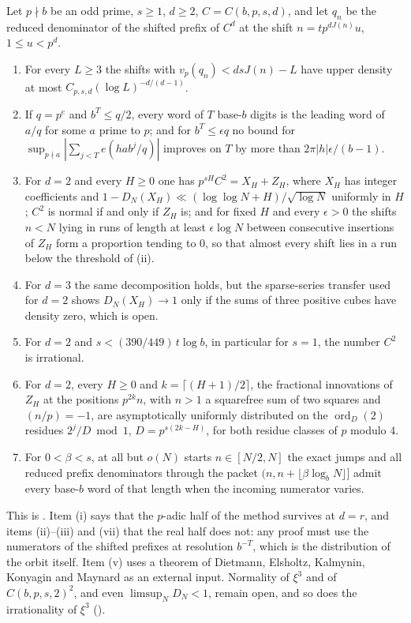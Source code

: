 \documentclass[11pt]{article}
\DeclareMathOperator{\ord}{ord}
\begin{document}
\begin{maintheorem}[The boundary $d=r$]\label{thm:boundary}
Let $p\nmid b$ be an odd prime, $s\ge1$, $d\ge2$, $C=C(b,p,s,d)$, and let $q_n$ be the reduced
denominator of the shifted prefix of $C^d$ at the shift $n=tp^{dJ(n)}u$, $1\le u<p^d$.
\begin{enumerate}[label=\textup{(\roman*)},nosep]
\item For every $L\ge3$ the shifts with $v_p(q_n)<dsJ(n)-L$ have upper density at most
$C_{p,s,d}(\log L)^{-d/(d-1)}$.
\item If $q=p^e$ and $b^T\le q/2$, every word of $T$ base-$b$ digits is the leading word of $a/q$ for
some $a$ prime to $p$; and for $b^T\le\epsilon q$ no bound for
$\sup_{p\nmid a}|\sum_{j<T}e(hab^j/q)|$ improves on $T$ by more than $2\pi|h|\epsilon/(b-1)$.
\item For $d=2$ and every $H\ge0$ one has $p^{sH}C^2=X_H+Z_H$, where $X_H$ has integer coefficients and
$1-D_N(X_H)\ll(\log\log N+H)/\sqrt{\log N}$ uniformly in $H$; $C^2$ is normal if and only if $Z_H$ is;
and for fixed $H$ and every $\epsilon>0$ the shifts $n<N$ lying in runs of length at least
$\epsilon\log N$ between consecutive insertions of $Z_H$ form a proportion tending to $0$, so that
almost every shift lies in a run below the threshold of \textup{(ii)}.
\item For $d=3$ the same decomposition holds, but the sparse-series transfer used for $d=2$ shows
$D_N(X_H)\to1$ only if the sums of three positive cubes have density zero, which is open.
\item For $d=2$ and $s<(390/449)\,t\log b$, in particular for $s=1$, the number $C^2$ is irrational.
\item For $d=2$, every $H\ge0$ and $k=\lceil(H+1)/2\rceil$, the fractional innovations of $Z_H$ at the
positions $p^{2k}n$, with $n>1$ a squarefree sum of two squares and $(n/p)=-1$, are asymptotically
uniformly distributed on the $\ord_D(2)$ residues $2^j/D\bmod1$, $D=p^{s(2k-H)}$, for both residue classes
of $p$ modulo $4$.
\item For $0<\beta<s$, at all but $o(N)$ starts $n\in[N/2,N]$ the exact jumps and all reduced
prefix denominators through the packet $(n,n+\lfloor\beta\log_bN\rfloor]$ admit every base-$b$ word of
that length when the incoming numerator varies.
\end{enumerate}
\end{maintheorem}

This is . Item (i) says that the $p$-adic half of the method survives at $d=r$,
and items (ii)--(iii) and (vii) that the real half does not: any proof must use the numerators of the
shifted prefixes at resolution $b^{-T}$, which is the distribution of the orbit itself. Item (v) uses
a theorem of Dietmann, Elsholtz, Kalmynin, Konyagin and Maynard \cite[Theorem~1]{DEKKM} as an external
input. Normality of $\xi^3$ and of $C(b,p,s,2)^2$, and even $\limsup_ND_N<1$, remain open, and so does
the irrationality of $\xi^3$ ().
\end{document}
